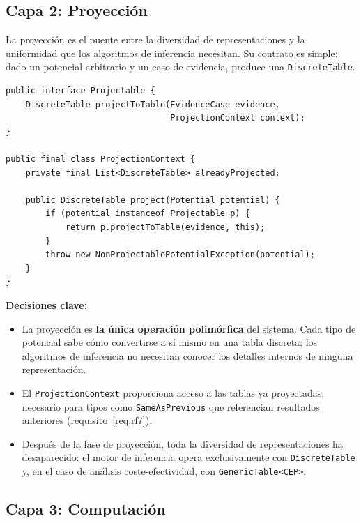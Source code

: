 \documentclass[11pt,a4paper]{article}
\newcommand{\code}[1]{\texttt{#1}}
\begin{document}
\subsection{Capa 2: Proyección}
\label{sec:ideal-capa2}

La proyección es el puente entre la diversidad de representaciones y la
uniformidad que los algoritmos de inferencia necesitan.  Su contrato es
simple: dado un potencial arbitrario y un caso de evidencia, produce
una \code{DiscreteTable}.

\begin{lstlisting}[caption={Interfaz de proyección y contexto}]
public interface Projectable {
    DiscreteTable projectToTable(EvidenceCase evidence,
                                 ProjectionContext context);
}

public final class ProjectionContext {
    private final List<DiscreteTable> alreadyProjected;

    public DiscreteTable project(Potential potential) {
        if (potential instanceof Projectable p) {
            return p.projectToTable(evidence, this);
        }
        throw new NonProjectablePotentialException(potential);
    }
}
\end{lstlisting}

\noindent \textbf{Decisiones clave:}

\begin{itemize}
  \item La proyección es \textbf{la única operación polimórfica} del sistema.
        Cada tipo de potencial sabe cómo convertirse a sí mismo en una tabla
        discreta; los algoritmos de inferencia no necesitan conocer los
        detalles internos de ninguna representación.

  \item El \code{ProjectionContext} proporciona acceso a las tablas ya
        proyectadas, necesario para tipos como \code{SameAsPrevious} que
        referencian resultados anteriores (requisito~\ref{req:rf7}).

  \item Después de la fase de proyección, toda la diversidad de representaciones
        ha desaparecido: el motor de inferencia opera exclusivamente con
        \code{DiscreteTable} y, en el caso de análisis coste-efectividad,
        con \code{GenericTable<CEP>}.
\end{itemize}

\subsection{Capa 3: Computación}
\label{sec:ideal-capa3}
\end{document}
